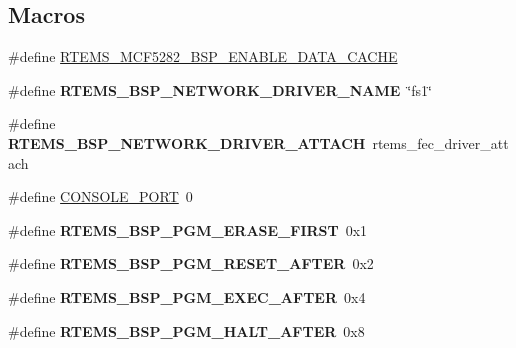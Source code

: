 \subsection*{Macros}
\begin{DoxyCompactItemize}
\item 
\#define \mbox{\hyperlink{group__RTEMSBSPsM68kUC5282_ga8929b963b687e75af2467c8551c91cb0}{R\+T\+E\+M\+S\+\_\+\+M\+C\+F5282\+\_\+\+B\+S\+P\+\_\+\+E\+N\+A\+B\+L\+E\+\_\+\+D\+A\+T\+A\+\_\+\+C\+A\+C\+HE}}
\item 
\mbox{\label{group__RTEMSBSPsM68kUC5282_ga86d4f9aa98431100692e31068070a8df}} 
\#define {\bfseries R\+T\+E\+M\+S\+\_\+\+B\+S\+P\+\_\+\+N\+E\+T\+W\+O\+R\+K\+\_\+\+D\+R\+I\+V\+E\+R\+\_\+\+N\+A\+ME}~\char`\"{}fs1\char`\"{}
\item 
\mbox{\label{group__RTEMSBSPsM68kUC5282_gadde0d66aef9442971dde465292ac14e6}} 
\#define {\bfseries R\+T\+E\+M\+S\+\_\+\+B\+S\+P\+\_\+\+N\+E\+T\+W\+O\+R\+K\+\_\+\+D\+R\+I\+V\+E\+R\+\_\+\+A\+T\+T\+A\+CH}~rtems\+\_\+fec\+\_\+driver\+\_\+attach
\item 
\#define \mbox{\hyperlink{group__RTEMSBSPsM68kUC5282_ga0859abd84f64f7f09ad95a4079b06f41}{C\+O\+N\+S\+O\+L\+E\+\_\+\+P\+O\+RT}}~0
\item 
\mbox{\label{group__RTEMSBSPsM68kUC5282_gab5271bc7b15db3fa9c8ec3e4e46a1a68}} 
\#define {\bfseries R\+T\+E\+M\+S\+\_\+\+B\+S\+P\+\_\+\+P\+G\+M\+\_\+\+E\+R\+A\+S\+E\+\_\+\+F\+I\+R\+ST}~0x1
\item 
\mbox{\label{group__RTEMSBSPsM68kUC5282_ga150d49eb9bfeae7a03f3b609401db518}} 
\#define {\bfseries R\+T\+E\+M\+S\+\_\+\+B\+S\+P\+\_\+\+P\+G\+M\+\_\+\+R\+E\+S\+E\+T\+\_\+\+A\+F\+T\+ER}~0x2
\item 
\mbox{\label{group__RTEMSBSPsM68kUC5282_gaf3ffbcb36d74a4183966c323341a7604}} 
\#define {\bfseries R\+T\+E\+M\+S\+\_\+\+B\+S\+P\+\_\+\+P\+G\+M\+\_\+\+E\+X\+E\+C\+\_\+\+A\+F\+T\+ER}~0x4
\item 
\mbox{\label{group__RTEMSBSPsM68kUC5282_ga090e8e8f854e6ac6860a389d1abfe054}} 
\#define {\bfseries R\+T\+E\+M\+S\+\_\+\+B\+S\+P\+\_\+\+P\+G\+M\+\_\+\+H\+A\+L\+T\+\_\+\+A\+F\+T\+ER}~0x8

\end{DoxyCompactItemize}
